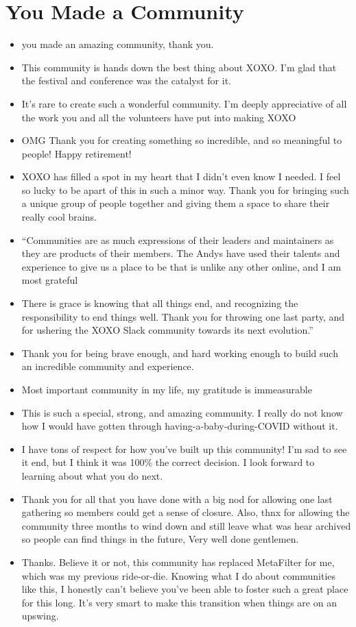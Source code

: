 \documentclass[
]{book}
\providecommand{\tightlist}{%
  \setlength{\itemsep}{0pt}\setlength{\parskip}{0pt}}
\begin{document}
\section{You Made a Community}\label{you-made-a-community}

\begin{itemize}
\tightlist
\item
  you made an amazing community, thank you.
\item
  This community is hands down the best thing about XOXO. I'm glad that the festival and conference was the catalyst for it.
\item
  It's rare to create such a wonderful community. I'm deeply appreciative of all the work you and all the volunteers have put into making XOXO
\item
  OMG Thank you for creating something so incredible, and so meaningful to people! Happy retirement!
\item
  XOXO has filled a spot in my heart that I didn't even know I needed. I feel so lucky to be apart of this in such a minor way. Thank you for bringing such a unique group of people together and giving them a space to share their really cool brains.
\item
  ``Communities are as much expressions of their leaders and maintainers as they are products of their members. The Andys have used their talents and experience to give us a place to be that is unlike any other online, and I am most grateful
\item
  There is grace is knowing that all things end, and recognizing the responsibility to end things well. Thank you for throwing one last party, and for ushering the XOXO Slack community towards its next evolution.''
\item
  Thank you for being brave enough, and hard working enough to build such an incredible community and experience.
\item
  Most important community in my life, my gratitude is immeasurable
\item
  This is such a special, strong, and amazing community. I really do not know how I would have gotten through having-a-baby-during-COVID without it.
\item
  I have tons of respect for how you've built up this community! I'm sad to see it end, but I think it was 100\% the correct decision. I look forward to learning about what you do next.
\item
  Thank you for all that you have done with a big nod for allowing one last gathering so members could get a sense of closure. Also, thnx for allowing the community three months to wind down and still leave what was hear archived so people can find things in the future, Very well done gentlemen.
\item
  Thanks. Believe it or not, this community has replaced MetaFilter for me, which was my previous ride-or-die. Knowing what I do about communities like this, I honestly can't believe you've been able to foster such a great place for this long. It's very smart to make this transition when things are on an upswing.
\end{itemize}
\end{document}
